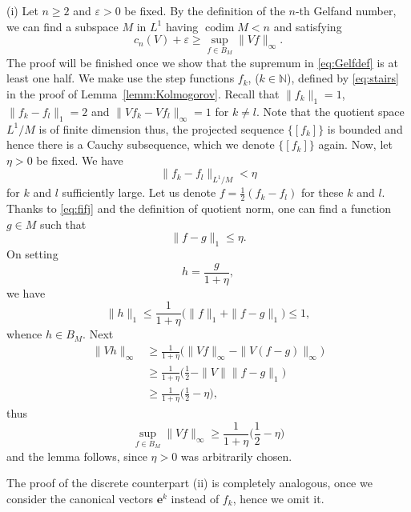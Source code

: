 \documentclass[10pt,reqno]{amsart}
\def\N{\mathbb{N}}
\def\codim{\operatorname{codim}}
\numberwithin{equation}{section}
\let\oldendproof\endproof
\renewenvironment{proof}[1][\proofname]{%
  \oldproof[\bf #1]%
}{\oldendproof}
\def\Li{{L^1}}
\def\ve{\mathbf{e}}
\begin{document}
\begin{proof}
(i)
Let $n\ge 2$ and $\varepsilon>0$ be fixed. By the definition of the $n$-th
Gelfand number, we can find a subspace $M$ in $\Li$ having $\codim M < n$ and satisfying
\begin{equation} \label{eq:Gelfdef}
	c_n(V) + \varepsilon
		\ge \sup_{f\in B_{M}} \|Vf\|_\infty.
\end{equation}
The proof will be finished once we show that the supremum in \eqref{eq:Gelfdef} is
at least one half.
We make use the step functions $f_k$, ($k\in\N$), defined by \eqref{eq:stairs} in the proof
of Lemma~\ref{lemm:Kolmogorov}. Recall that $\|f_k\|_1=1$, $\|f_k-f_l\|_1 = 2$
and $\|Vf_k - Vf_l\|_{\infty} = 1$ for $k\ne l$.
Note that the quotient space $\Li/M$ is of finite dimension thus,
the projected sequence $\{[f_k]\}$ is bounded and hence there is a Cauchy
subsequence, which we denote $\{[f_k]\}$ again.
Now, let $\eta>0$ be fixed. We have
\begin{equation} \label{eq:fifj}
	\|f_k - f_l\|_{\Li/M} < \eta
\end{equation}
for $k$ and $l$ sufficiently large. Let us denote $f = \frac{1}{2} (f_k - f_l)$ for these $k$ and $l$. Thanks to \eqref{eq:fifj} and the definition of quotient norm, one can find
a function $g\in M$ such that
\begin{equation*}
	\|f -g\|_1 \le \eta.
\end{equation*}
On setting
\begin{equation*}
	h = \frac{g}{1+\eta},
\end{equation*}
we have
\begin{equation*}
	\|h\|_1 \le \frac{1}{1+\eta}
		\bigl( \|f\|_1 + \|f-g\|_1 \bigr)
		\le 1,
\end{equation*}
whence $h\in B_M$.
Next
\begin{align*}
	\|Vh\|_\infty
		& \ge \frac{1}{1+\eta}
			\bigl( \|Vf\|_\infty - \|V(f-g)\|_\infty \bigr)
			\\
		& \ge \frac{1}{1+\eta}
			\biggl( \frac{1}{2} - \|V\| \|f-g\|_1 \biggr)
			\\
		& \ge \frac{1}{1+\eta}
			\biggl( \frac{1}{2} - \eta \biggr),
\end{align*}
thus
\begin{equation*}
	\sup_{f\in B_{M}} \|Vf\|_\infty
		\ge \frac{1}{1+\eta}
			\biggl( \frac{1}{2} - \eta \biggr)
\end{equation*}
and the lemma follows, since $\eta>0$ was arbitrarily chosen.

The proof of the discrete counterpart (ii) is completely analogous, once we
consider the canonical vectors $\ve^k$ instead of $f_k$, hence we omit it.
\end{proof}
\end{document}
